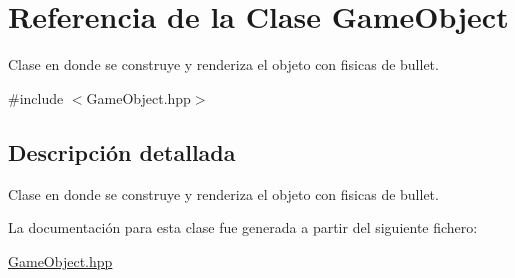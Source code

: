 \hypertarget{class_game_object}{}\section{Referencia de la Clase Game\+Object}
\label{class_game_object}


Clase en donde se construye y renderiza el objeto con fisicas de bullet.  




{\ttfamily \#include $<$Game\+Object.\+hpp$>$}



\subsection{Descripción detallada}
Clase en donde se construye y renderiza el objeto con fisicas de bullet. 

La documentación para esta clase fue generada a partir del siguiente fichero\+:\begin{DoxyCompactItemize}
\item 
\mbox{\hyperlink{_game_object_8hpp}{Game\+Object.\+hpp}}\end{DoxyCompactItemize}
